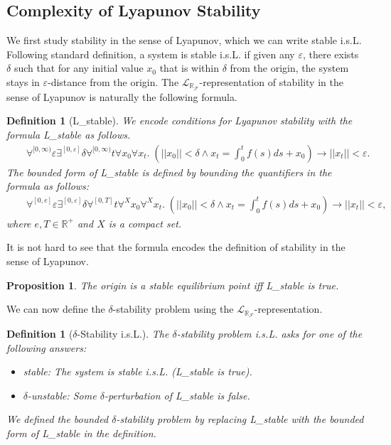 \documentclass[12pt]{article}
\theoremstyle{plain}
\newtheorem{proposition}[theorem]{Proposition}
\newtheorem{definition}[theorem]{Definition}
\theoremstyle{definition}
\newcommand{\lrf}{\mathcal{L}_{\mathbb{R}_{\mathcal{F}}}}
\begin{document}
\subsection{Complexity of Lyapunov Stability}

We first study stability in the sense of Lyapunov, which we can write stable i.s.L. Following standard definition, a system is stable i.s.L. if given any $\varepsilon$, there exists $\delta$ such that for any initial value $x_0$ that is within $\delta$ from the origin, the system stays in $\varepsilon$-distance from the origin. The $\lrf$-representation of stability in the sense of Lyapunov is naturally the following formula.
\begin{definition}[{\sf L\_stable}]
We encode conditions for Lyapunov stability with the formula {\sf L\_stable} as follows.
\begin{eqnarray*}
& &\forall^{[0,\infty)} \varepsilon\exists^{[0,\varepsilon]} \delta \forall^{[0,\infty)} t\forall x_0\forall x_t .\; (||x_0||<\delta \wedge x_t = \int_0^t f(s)ds + x_0 )\rightarrow ||x_t||<\varepsilon.
\end{eqnarray*}
The {\em bounded form} of {\sf L\_stable} is defined by bounding the quantifiers in the formula as follows:
\begin{eqnarray*}
& &\forall^{[0, e]} \varepsilon\exists^{[0,\varepsilon]} \delta \forall^{[0,T]} t\forall^X x_0\forall^X x_t. \;(||x_0||<\delta \wedge x_t = \int_0^t f(s)ds + x_0 )\rightarrow ||x_t||<\varepsilon,
\end{eqnarray*}
where $e, T\in \mathbb{R}^+$ and $X$ is a compact set.
\end{definition}

It is not hard to see that the formula encodes the definition of stability in the sense of Lyapunov.
\begin{proposition}
The origin is a stable equilibrium point iff {\sf L\_stable} is true.
\end{proposition}

We can now define the $\delta$-stability problem using the $\lrf$-representation.
\begin{definition}[$\delta$-Stability i.s.L.]\label{sl}
The $\delta$-stability problem i.s.L. asks for one of the following answers:
\begin{itemize}
\item {\sf stable}: The system is stable i.s.L. ({\sf L\_stable} is true).
\item {\sf $\delta$-unstable}: Some $\delta$-perturbation of {\sf L\_stable} is false.
\end{itemize}
We defined the {\em bounded} $\delta$-stability problem by replacing {\sf L\_stable} with the bounded form of {\sf L\_stable} in the definition.
\end{definition}
\end{document}
